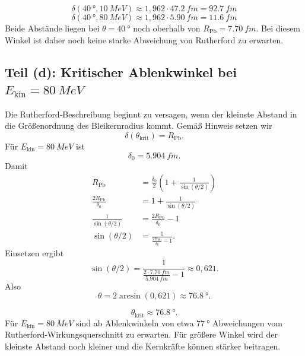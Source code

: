 \documentclass[11pt,a4paper]{scrartcl}
\newcommand{\paren}[1]{\left( #1 \right)}
\begin{document}
\begin{answerbox}
\[
    \boxed{\delta(\SI{40}{\degree},\SI{10}{MeV})
    \approx 1{,}962\cdot\SI{47.2}{fm}=\SI{92.7}{fm}}
\]
\[
    \boxed{\delta(\SI{40}{\degree},\SI{80}{MeV})
    \approx 1{,}962\cdot\SI{5.90}{fm}=\SI{11.6}{fm}}
\]
Beide Abst\"ande liegen bei $\theta=\SI{40}{\degree}$ noch oberhalb von $R_{\mathrm{Pb}}=\SI{7.70}{fm}$. Bei diesem Winkel ist daher noch keine starke Abweichung von Rutherford zu erwarten.
\end{answerbox}

\subsection{Teil (d): Kritischer Ablenkwinkel bei $E_{\mathrm{kin}}=\SI{80}{MeV}$}

\begin{calculationbox}[title=Bedingung f\"ur Abweichung]
Die Rutherford-Beschreibung beginnt zu versagen, wenn der kleinste Abstand in die Gr\"o\ss{}enordnung des Bleikernradius kommt. Gem\"a\ss{} Hinweis setzen wir
\[
    \delta(\theta_{\mathrm{krit}})=R_{\mathrm{Pb}}.
\]
F\"ur $E_{\mathrm{kin}}=\SI{80}{MeV}$ ist
\[
    \delta_0=\SI{5.904}{fm}.
\]
Damit
\begin{align*}
    R_{\mathrm{Pb}}&=\frac{\delta_0}{2}\paren{1+\frac{1}{\sin(\theta/2)}}\\
    \frac{2R_{\mathrm{Pb}}}{\delta_0}&=1+\frac{1}{\sin(\theta/2)}\\
    \frac{1}{\sin(\theta/2)}&=\frac{2R_{\mathrm{Pb}}}{\delta_0}-1\\
    \sin(\theta/2)&=\frac{1}{\frac{2R_{\mathrm{Pb}}}{\delta_0}-1}.
\end{align*}
Einsetzen ergibt
\[
    \sin(\theta/2)=\frac{1}{\frac{2\cdot\SI{7.70}{fm}}{\SI{5.904}{fm}}-1}
    \approx 0{,}621.
\]
Also
\[
    \theta=2\arcsin(0{,}621)\approx \SI{76.8}{\degree}.
\]
\end{calculationbox}

\begin{answerbox}
\[
    \boxed{\theta_{\mathrm{krit}}\approx \SI{76.8}{\degree}.}
\]
F\"ur $E_{\mathrm{kin}}=\SI{80}{MeV}$ sind ab Ablenkwinkeln von etwa $\SI{77}{\degree}$ Abweichungen vom Rutherford-Wirkungsquerschnitt zu erwarten. F\"ur gr\"o\ss{}ere Winkel wird der kleinste Abstand noch kleiner und die Kernkr\"afte k\"onnen st\"arker beitragen.
\end{answerbox}
\end{document}
